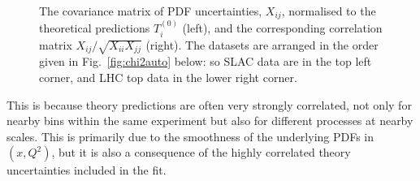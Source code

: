  \begin{figure}[H]
    \begin{center}
    \end{center}
  \vspace{-0.55cm}
  \caption{The covariance matrix of PDF uncertainties, $X_{ij}$, normalised to the theoretical predictions $T^{(0)}_i$  (left), and the corresponding correlation matrix $X_{ij}/\sqrt{X_{ii}X_{jj}}$ (right). The datasets are arranged in the order given in Fig.~\ref{fig:chi2auto} below: so SLAC data are in the top left corner, and LHC top data in the lower right corner.}
  \label{fig:X}
\end{figure}
This is because theory predictions are often very strongly correlated, not only for nearby bins within the same experiment but also for different processes at nearby scales. This is primarily due to the smoothness of the underlying PDFs in $(x,Q^2)$, but it is also a consequence of the highly correlated theory uncertainties included in the fit.

